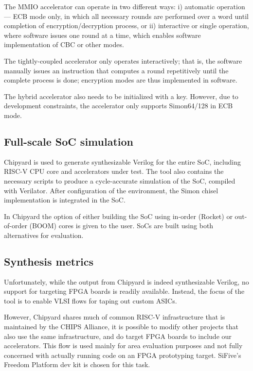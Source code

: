 \documentclass[10pt,conference]{IEEEtran}
\begin{document}
The MMIO accelerator can operate in two different ways: i) automatic
operation --- ECB mode only, in which all necessary rounds are performed over a word until
completion of encryption/decryption process, or ii) interactive or single operation, where
software issues one round at a time, which enables software implementation of
CBC or other modes.

The tightly-coupled accelerator only operates interactively; that is, the
software manually issues an instruction that computes a round repetitively
until the complete process is done; encryption modes are thus
implemented in software.

The hybrid accelerator also needs to be initialized with a key. However, due to
development constraints, the accelerator only supports Simon64/128 in ECB mode.


\subsection{Full-scale SoC simulation}

Chipyard is used to generate synthesizable Verilog for the
entire SoC, including RISC-V CPU core and accelerators under test. The tool also
contains the necessary scripts to produce a cycle-accurate simulation of the
SoC, compiled with Verilator. After configuration of the environment, the Simon
chisel implementation is integrated in the SoC.

In Chipyard the option of either building the SoC using in-order (Rocket) or
out-of-order (BOOM) cores is given to the user. SoCs are built using both
alternatives for evaluation.

\subsection{Synthesis metrics}

Unfortunately, while the output from Chipyard is indeed synthesizable Verilog,
no support for targeting FPGA boards is readily available. Instead, the focus of
the tool is to enable VLSI flows for taping out custom ASICs.

However, Chipyard shares much of common RISC-V infrastructure that is maintained
by the CHIPS Alliance, it is possible to modify other projects that also use the
same infrastructure, and do target FPGA boards to include our accelerators. This
flow is used mainly for area evaluation purposes and not fully concerned with
actually running code on an FPGA prototyping target. SiFive's Freedom Platform
dev kit is chosen for this task.
\end{document}
